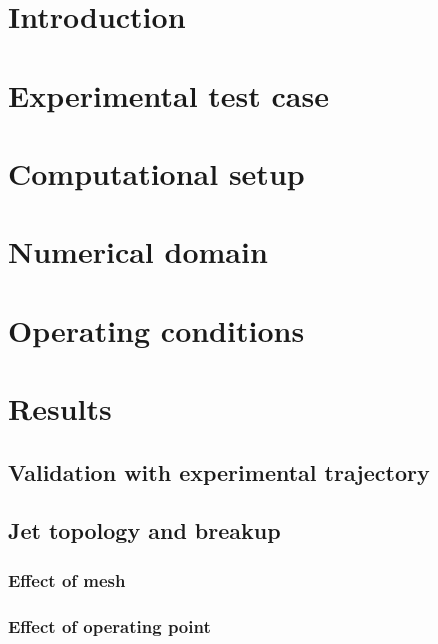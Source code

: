 \section{Introduction}

\section{Experimental test case}

\section{Computational setup}



\section*{Numerical domain}

\section*{Operating conditions}


\section{Results}

\subsection{Validation with experimental trajectory}

\subsection{Jet topology and breakup}

\subsubsection{Effect of mesh}

\subsubsection{Effect of operating point}

